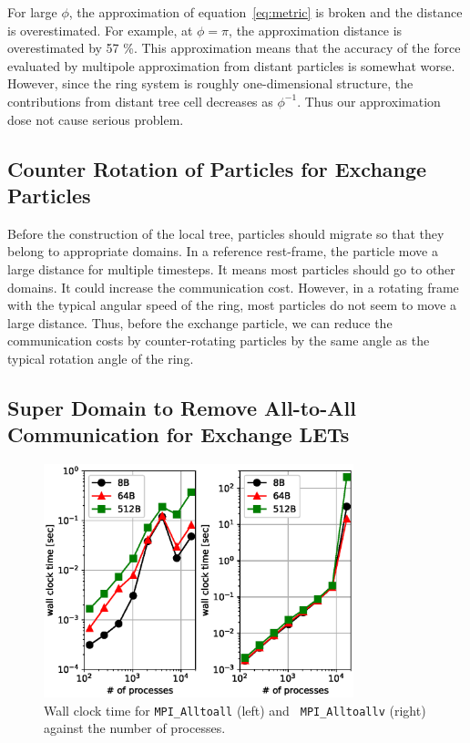 \documentclass[]{pasj01}
\begin{document}
For large $\phi$, the approximation of equation~\ref{eq:metric} is
broken and the distance is overestimated. For example, at $\phi=\pi$,
the approximation distance is overestimated by 57 \%. This
approximation means that the accuracy of the force evaluated by
multipole approximation from distant particles is somewhat
worse. However, since the ring system is roughly one-dimensional
structure, the contributions from distant tree cell decreases as
$\phi^{-1}$. Thus our approximation dose not cause serious problem.

\subsection{Counter Rotation of Particles for Exchange Particles}
\label{subsec:exptcl}

Before the construction of the local tree, particles should migrate so
that they belong to appropriate domains. In a reference rest-frame,
the particle move a large distance for multiple timesteps. It means
most particles should go to other domains. It could increase the
communication cost. However, in a rotating frame with the typical
angular speed of the ring, most particles do not seem to move a large
distance. Thus, before the exchange particle, we can reduce the
communication costs by counter-rotating particles by the same angle as
the typical rotation angle of the ring.

\subsection{Super Domain to Remove All-to-All Communication for Exchange LETs}
\label{subsec:exlet}

\begin{figure}
  \centering \includegraphics[width=9cm,clip]{./fig/comm_np-wtime.eps}
  \caption{Wall clock time for {\tt MPI\_Alltoall} (left) and {\tt
      MPI\_Alltoallv} (right) against the number of processes.}
  \label{fig:comm_np-wtime}
\end{figure}
\end{document}
